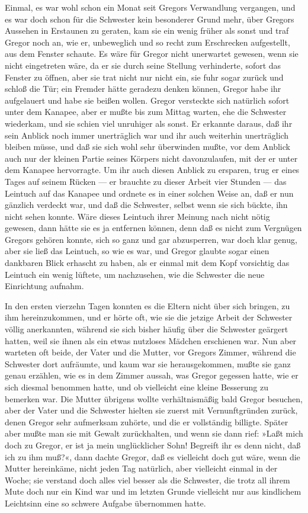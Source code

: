 Einmal, es war wohl schon ein Monat seit Gregors Verwandlung vergangen,
und es war doch schon für die Schwester kein besonderer Grund mehr, über
Gregors Aussehen in Erstaunen zu geraten, kam sie ein wenig früher als
sonst und traf Gregor noch an, wie er, unbeweglich und so recht zum
Erschrecken aufgestellt, aus dem Fenster schaute. Es wäre für Gregor
nicht unerwartet gewesen, wenn sie nicht eingetreten wäre, da er sie
durch seine Stellung verhinderte, sofort das Fenster zu öffnen, aber sie
trat nicht nur nicht ein, sie fuhr sogar zurück und schloß die Tür; ein
Fremder hätte geradezu denken können, Gregor habe ihr aufgelauert und
habe sie beißen wollen. Gregor versteckte sich natürlich sofort unter
dem Kanapee, aber er mußte bis zum Mittag warten, ehe die Schwester
wiederkam, und sie schien viel unruhiger als sonst. Er erkannte daraus,
daß ihr sein Anblick noch immer unerträglich war und ihr auch weiterhin
unerträglich bleiben müsse, und daß sie sich wohl sehr überwinden mußte,
vor dem Anblick auch nur der kleinen Partie seines Körpers nicht
davonzulaufen, mit der er unter dem Kanapee hervorragte. Um ihr auch
diesen Anblick zu ersparen, trug er eines Tages auf seinem Rücken --- er
brauchte zu dieser Arbeit vier Stunden --- das Leintuch auf das Kanapee
und ordnete es in einer solchen Weise an, daß er nun gänzlich verdeckt
war, und daß die Schwester, selbst wenn sie sich bückte, ihn nicht sehen
konnte. Wäre dieses Leintuch ihrer Meinung nach nicht nötig gewesen,
dann hätte sie es ja entfernen können, denn daß es nicht zum Vergnügen
Gregors gehören konnte, sich so ganz und gar abzusperren, war doch klar
genug, aber sie ließ das Leintuch, so wie es war, und Gregor glaubte
sogar einen dankbaren Blick erhascht zu haben, als er einmal mit dem
Kopf vorsichtig das Leintuch ein wenig lüftete, um nachzusehen, wie die
Schwester die neue Einrichtung aufnahm.

In den ersten vierzehn Tagen konnten es die Eltern nicht über sich
bringen, zu ihm hereinzukommen, und er hörte oft, wie sie die jetzige
Arbeit der Schwester völlig anerkannten, während sie sich bisher häufig
über die Schwester geärgert hatten, weil sie ihnen als ein etwas
nutzloses Mädchen erschienen war. Nun aber warteten oft beide, der Vater
und die Mutter, vor Gregors Zimmer, während die Schwester dort
aufräumte, und kaum war sie herausgekommen, mußte sie ganz genau
erzählen, wie es in dem Zimmer aussah, was Gregor gegessen hatte, wie er
sich diesmal benommen hatte, und ob vielleicht eine kleine Besserung zu
bemerken war. Die Mutter übrigens wollte verhältnismäßig bald Gregor
besuchen, aber der Vater und die Schwester hielten sie zuerst mit
Vernunftgründen zurück, denen Gregor sehr aufmerksam zuhörte, und die er
vollständig billigte. Später aber mußte man sie mit Gewalt zurückhalten,
und wenn sie dann rief: »Laßt mich doch zu Gregor, er ist ja mein
unglücklicher Sohn! Begreift ihr es denn nicht, daß ich zu ihm muß?«,
dann dachte Gregor, daß es vielleicht doch gut wäre, wenn die Mutter
hereinkäme, nicht jeden Tag natürlich, aber vielleicht einmal in der
Woche; sie verstand doch alles viel besser als die Schwester, die trotz
all ihrem Mute doch nur ein Kind war und im letzten Grunde vielleicht
nur aus kindlichem Leichtsinn eine so schwere Aufgabe übernommen hatte.

